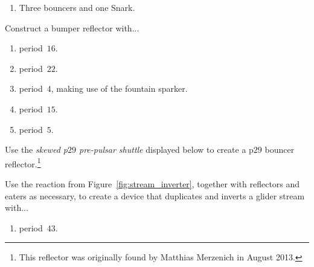\begin{multicols}{2}
\begin{problemstar}
\begin{enumerate}[label=\bf\color{ocre}(\alph*)]
			\item Three bouncers and one Snark.
		\end{enumerate}
	\end{problemstar}
	
	
	\mfilbreak
	
	
	\begin{problemstar}\label{exer:bumper_high_period}
		Construct a bumper reflector with...\smallskip
		
		\begin{enumerate}[label=\bf\color{ocre}(\alph*)]
			\item {} period~$16$.
			
			\item {} period~$22$.
			
			\item {} period~$4$, making use of the fountain sparker.
			
			\item {} period~$15$.
			
			\item {} period~$5$.
			
		\end{enumerate}
	\end{problemstar}


	\mfilbreak
	
	
	\begin{problemstar}\label{exer:p29_pipsquirter} 
		Use the \emph{skewed p$29$ pre-pulsar shuttle} displayed below to create a p$29$ bouncer reflector.\footnote{This reflector was originally found by Matthias Merzenich in August 2013.}
		
		\begin{center}
		\end{center}
	\end{problemstar}


	\mfilbreak
	
	
	\begin{problem}\label{exer:make_inline_inverter_with_weird_period} 
		Use the reaction from Figure~\ref{fig:stream_inverter}, together with reflectors and eaters as necessary, to create a device that duplicates and inverts a glider stream with...\smallskip
		
		\begin{enumerate}[label=\bf\color{ocre}(\alph*)]
			\item period~$43$.
			

\end{enumerate}
\end{problem}
\end{multicols}
